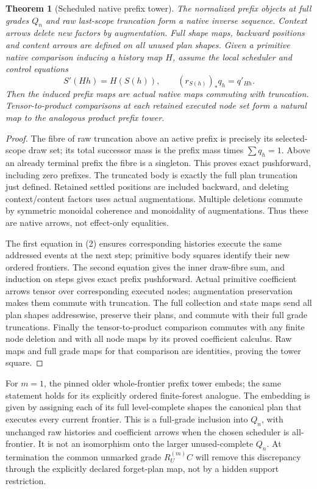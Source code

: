 \documentclass[11pt]{article}
\newtheorem{theorem}{Theorem}\newtheorem{proposition}[theorem]{Proposition}
\begin{document}
\begin{theorem}[Scheduled native prefix tower]
The normalized prefix objects at full grades $Q_n$ and raw last-scope truncation form a native inverse sequence. Context arrows delete new factors by augmentation. Full shape maps, backward positions and content arrows are defined on all unused plan shapes. Given a primitive native comparison inducing a history map $H$, assume the local scheduler and control equations
\[
 S'(Hh)=H(S(h)),\qquad (r_{S(h)})_*q_h=q'_{Hh}.             \tag{2}
\]
Then the induced prefix maps are actual native maps commuting with truncation. Tensor-to-product comparisons at each retained executed node set form a natural map to the analogous product prefix tower.
\end{theorem}
\begin{proof}
The fibre of raw truncation above an active prefix is precisely its selected-scope draw set; its total successor mass is the prefix mass times $\sum q_h=1$. Above an already terminal prefix the fibre is a singleton. This proves exact pushforward, including zero prefixes. The truncated body is exactly the full plan truncation just defined. Retained settled positions are included backward, and deleting context/content factors uses actual augmentations. Multiple deletions commute by symmetric monoidal coherence and monoidality of augmentations. Thus these are native arrows, not effect-only equalities.

The first equation in (2) ensures corresponding histories execute the same addressed events at the next step; primitive body squares identify their new ordered frontiers. The second equation gives the inner draw-fibre sum, and induction on steps gives exact prefix pushforward. Actual primitive coefficient arrows tensor over corresponding executed nodes; augmentation preservation makes them commute with truncation. The full collection and state maps send all plan shapes addresswise, preserve their plans, and commute with their full grade truncations. Finally the tensor-to-product comparison commutes with any finite node deletion and with all node maps by its proved coefficient calculus. Raw maps and full grade maps for that comparison are identities, proving the tower square.
\end{proof}

For $m=1$, the pinned older whole-frontier prefix tower embeds; the same statement holds for its explicitly ordered finite-forest analogue. The embedding is given by assigning each of its full level-complete shapes the canonical plan that executes every current frontier. This is a full-grade inclusion into $Q_n$, with unchanged raw histories and coefficient arrows when the chosen scheduler is all-frontier. It is not an isomorphism onto the larger unused-complete $Q_n$. At termination the common unmarked grade $R_U^{(m)}C$ will remove this discrepancy through the explicitly declared forget-plan map, not by a hidden support restriction.
\end{document}
